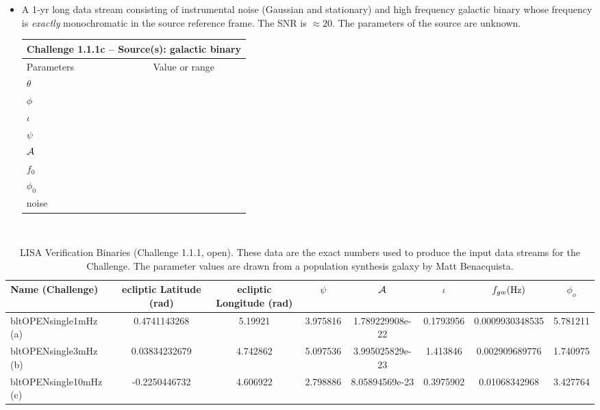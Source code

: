 \documentclass[11pt]{report}
\begin{document}
\begin{itemize}
\item A 1-yr long data stream consisting of instrumental noise (Gaussian and stationary) and high frequency galactic binary whose frequency is {\em exactly} monochromatic in the source reference frame. The SNR is $\approx 20$. The parameters of the source are unknown.


\begin{center}
\begin{tabular}{l|c}
\hline \hline
\multicolumn{2}{c}{{\bf Challenge 1.1.1c -- Source(s): galactic binary}} \\
\hline
Parameters & Value or range \\
\hline
$\theta$ & \\
$\phi$   & \\ 
$\iota$  & \\ 
$\psi$   & \\
${\cal A}$ & \\
$f_0$    & \\ 
$\phi_0$ & \\
noise    & \\
\hline \hline
\end{tabular} \\
\end{center}


\end{itemize}


\begin{sidewaystable}
\centering
\small{
\begin{tabular}{|l|c|c|c|c|c|c|c|}
\hline \textbf{Name (Challenge)} & {\bf ecliptic Latitude (rad)} & {\bf ecliptic
Longitude (rad)} & $\psi$ & $\cal A$ &$\iota$ & $f_{gw} ({\rm Hz})$ &
$\phi_{o}$ \\
\hline 
bltOPENsingle1mHz (a) & 0.4741143268 & 5.19921 & 3.975816 & 1.789229908e-22 & 0.1793956 & 0.0009930348535 & 5.781211\\
bltOPENsingle3mHz (b) & 0.03834232679 & 4.742862 & 5.097536 & 3.995025829e-23 & 1.413846 & 0.002909689776 & 1.740975\\
bltOPENsingle10mHz (c) & -0.2250446732 & 4.606922 & 2.798886 & 8.05894569e-23 & 0.3975902 & 0.01068342968 & 3.427764\\
\hline
\end{tabular}
    \caption{LISA Verification Binaries (Challenge 1.1.1, open).  These data are the exact numbers
    used to produce the input data streams for the Challenge.  The parameter values are drawn from a population synthesis galaxy by
    Matt Benacquista.}
}
\label{tbl.LISAbinaries1.1.1}
\end{sidewaystable}
\end{document}
